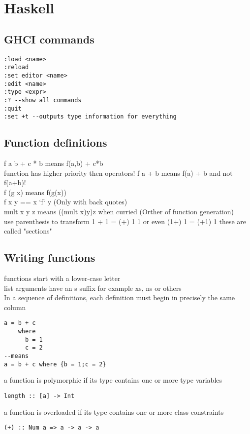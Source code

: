 \documentclass[12pt]{article}
\begin{document}
\section*{Haskell}
\subsection*{GHCI commands}
\begin{verbatim}
:load <name>
:reload
:set editor <name>
:edit <name>
:type <expr>
:? --show all commands
:quit
:set +t --outputs type information for everything
\end{verbatim}

\subsection*{Function definitions}
f a b + c * b means f(a,b) + c*b\\
function has higher priority then operators! f a + b means f(a) + b and not f(a+b)!\\
f (g x) means f(g(x))\\
f x y == x `f` y (Only with back quotes)\\
mult x y z means ((mult x)y)z when curried (Orther of function generation)\\
use parenthesis to transform 1 + 1 = (+) 1 1 or even (1+) 1 = (+1) 1 these are called "sections"\\

\subsection*{Writing functions}
functions start with a lower-case letter\\
list arguments have an s suffix for example xs, ns or others\\
In a sequence of definitions, each definition must begin in precisely the same column\\
\begin{verbatim}
a = b + c
    where
      b = 1
      c = 2
--means
a = b + c where {b = 1;c = 2}
\end{verbatim}
a function is polymorphic if its type contains one or more type variables 
\begin{verbatim}
length :: [a] -> Int
\end{verbatim}
a function is overloaded if its type contains one or more class constraints 
\begin{verbatim}
(+) :: Num a => a -> a -> a
\end{verbatim}
\end{document}

